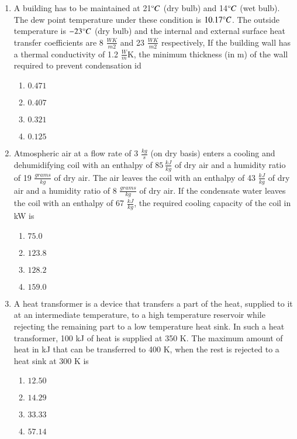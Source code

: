 \documentclass[journal,9pt,onecolumn]{IEEEtran}
\begin{document}
\begin{enumerate}


\item A building has to be maintained at 21$\degree C$ (dry bulb) and 14$\degree C$ (wet bulb). The dew point temperature under these condition is $10.17\degree C$. The outside temperature is $-23\degree C$ (dry bulb) and the internal and external surface heat transfer coefficients are 8 $\frac{WK}{m2}$ and 23 $\frac{WK}{m2}$ respectively, If the building wall has a thermal conductivity of 1.2 $\frac{W}{m}$K, the minimum thickness (in m) of the wall required to prevent condensation id
\begin{multicols}{4}
\begin{enumerate}
    \item $0.471$
    \item $0.407$
    \item $0.321$
    \item $0.125$
\end{enumerate}
\end{multicols}

\item Atmospheric air at a flow rate of 3 $\frac{kg}{s}$ (on dry basis) enters a cooling and dehumidifying coil with an enthalpy of $85\, \frac{kJ}{kg}$ of dry air and a humidity ratio of 19 $\frac{grams}{kg}$ of dry air. The air leaves the coil with an enthalpy of 43 $\frac{kJ}{kg}$ of dry air and a humidity ratio of 8 $\frac{grams}{kg}$ of dry air. If the condensate water leaves the coil with an enthalpy of 67 $\frac{kJ}{kg}$, the required cooling capacity of the coil in kW is
\begin{multicols}{4}
\begin{enumerate}
    \item $75.0$
    \item $123.8$
    \item $128.2$
    \item $159.0$
\end{enumerate}
\end{multicols}



\item A heat transformer is a device that transfers a part of the heat, supplied to it at an intermediate temperature, to a high temperature reservoir while rejecting the remaining part to a low temperature heat sink. In such a heat transformer, 100 kJ of heat is supplied at 350 K. The maximum amount of heat in kJ that can be transferred to 400 K, when the rest is rejected to a heat sink at 300 K is
\begin{multicols}{4}
\begin{enumerate}
    \item $12.50$ 
    \item $14.29$ 
    \item $33.33$ 
    \item $57.14$ 
\end{enumerate}
\end{multicols}


\end{enumerate}
\end{document}
